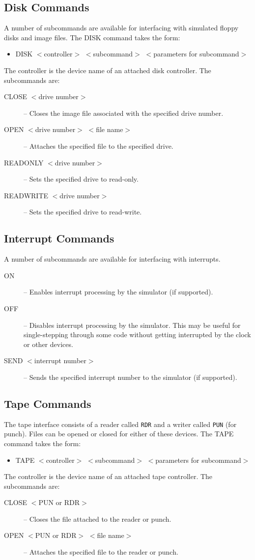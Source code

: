 \documentclass[10pt, openany]{book}
\begin{document}
\subsection{Disk Commands}
A number of subcommands are available for interfacing with simulated floppy disks and image files.  The DISK command takes the form:
\begin{itemize}
  \item DISK $<$controller$>$ $<$subcommand$>$ $<$parameters for subcommand$>$
\end{itemize}
The controller is the device name of an attached disk controller.  The subcommands are:
\begin{description}
  \item[CLOSE $<$drive number$>$] -- Closes the image file associated with the specified drive number.
  \item[OPEN $<$drive number$>$ $<$file name$>$] -- Attaches the specified file to the specified drive.
  \item[READONLY $<$drive number$>$] -- Sets the specified drive to read-only.
  \item[READWRITE $<$drive number$>$] -- Sets the specified drive to read-write.
\end{description}

\subsection{Interrupt Commands}
A number of subcommands are available for interfacing with interrupts.
\begin{description}
  \item[ON] -- Enables interrupt processing by the simulator (if supported).
  \item[OFF] -- Disables interrupt processing by the simulator.  This may be useful for single-stepping through some code without getting interrupted by the clock or other devices.
  \item[SEND $<$interrupt number$>$] --  Sends the specified interrupt number to the simulator (if supported).
\end{description}

\subsection{Tape Commands}
The tape interface consists of a reader called \verb|RDR| and a writer called \verb|PUN| (for punch).  Files can be opened or closed for either of these devices.   The TAPE command takes the form:
\begin{itemize}
  \item TAPE $<$controller$>$ $<$subcommand$>$ $<$parameters for subcommand$>$
\end{itemize}
The controller is the device name of an attached tape controller.  The subcommands are:
\begin{description}
  \item[CLOSE $<$PUN or RDR$>$]  -- Closes the file attached to the reader or punch.
  \item[OPEN $<$PUN or RDR$>$ $<$file name$>$] --  Attaches the specified file to the reader or punch.
\end{description}
\end{document}
